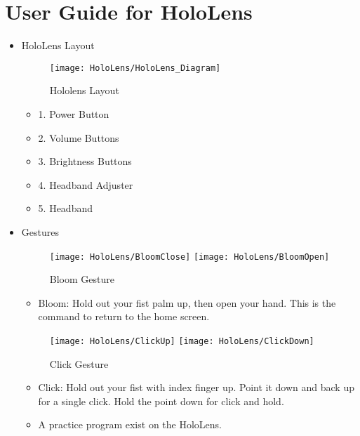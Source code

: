 \section{User Guide for HoloLens}
\begin{itemize}
    \item HoloLens Layout

    \begin{figure}[H]
    \texttt{[image: HoloLens/HoloLens\_Diagram]}
    \centering
    \caption{Hololens Layout}
    \label{fig:HoloLens_Diagram}
    \end{figure}

    \begin{itemize}
        \item 1. Power Button
        \item 2. Volume Buttons
        \item 3. Brightness Buttons
        \item 4. Headband Adjuster
        \item 5. Headband
    \end{itemize}

    \item Gestures

    \begin{figure}[H]
        \centering
        \texttt{[image: HoloLens/BloomClose]}
        \texttt{[image: HoloLens/BloomOpen]}
        \caption{Bloom Gesture}
        \label{fig:BloomGesture}
    \end{figure}

        \begin{itemize}
            \item Bloom: Hold out your fist palm up, then open your hand. This is the command to return to the home screen.
        \end{itemize}

    \begin{figure}[H]
        \centering
        \texttt{[image: HoloLens/ClickUp]}
        \texttt{[image: HoloLens/ClickDown]}
        \caption{Click Gesture}
        \label{fig:ClickGesture}
    \end{figure}

    \begin{itemize}
        \item Click: Hold out your fist with index finger up. Point it down and back up for a single click. Hold the point down for click and hold.
        \item A practice program exist on the HoloLens.
    \end{itemize}


\end{itemize}
